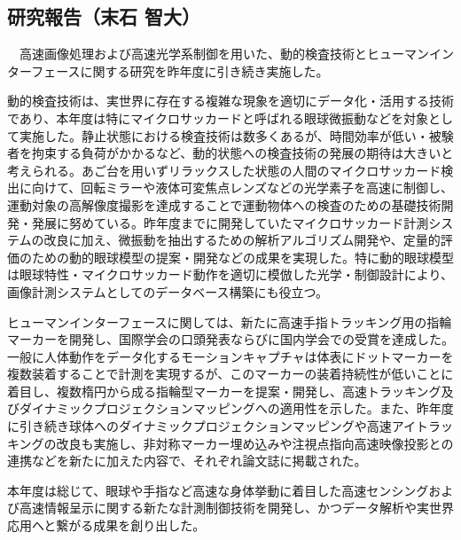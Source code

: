 \subsection{研究報告（末石 智大）}

　高速画像処理および高速光学系制御を用いた、動的検査技術とヒューマンインターフェースに関する研究を昨年度に引き続き実施した。

動的検査技術は、実世界に存在する複雑な現象を適切にデータ化・活用する技術であり、本年度は特にマイクロサッカードと呼ばれる眼球微振動などを対象として実施した。静止状態における検査技術は数多くあるが、時間効率が低い・被験者を拘束する負荷がかかるなど、動的状態への検査技術の発展の期待は大きいと考えられる。あご台を用いずリラックスした状態の人間のマイクロサッカード検出に向けて、回転ミラーや液体可変焦点レンズなどの光学素子を高速に制御し、運動対象の高解像度撮影を達成することで運動物体への検査のための基礎技術開発・発展に努めている。昨年度までに開発していたマイクロサッカード計測システムの改良に加え、微振動を抽出するための解析アルゴリズム開発や、定量的評価のための動的眼球模型の提案・開発などの成果を実現した。特に動的眼球模型は眼球特性・マイクロサッカード動作を適切に模倣した光学・制御設計により、画像計測システムとしてのデータベース構築にも役立つ。

ヒューマンインターフェースに関しては、新たに高速手指トラッキング用の指輪マーカーを開発し、国際学会の口頭発表ならびに国内学会での受賞を達成した。一般に人体動作をデータ化するモーションキャプチャは体表にドットマーカーを複数装着することで計測を実現するが、このマーカーの装着持続性が低いことに着目し、複数楕円から成る指輪型マーカーを提案・開発し、高速トラッキング及びダイナミックプロジェクションマッピングへの適用性を示した。また、昨年度に引き続き球体へのダイナミックプロジェクションマッピングや高速アイトラッキングの改良も実施し、非対称マーカー埋め込みや注視点指向高速映像投影との連携などを新たに加えた内容で、それぞれ論文誌に掲載された。

本年度は総じて、眼球や手指など高速な身体挙動に着目した高速センシングおよび高速情報呈示に関する新たな計測制御技術を開発し、かつデータ解析や実世界応用へと繋がる成果を創り出した。